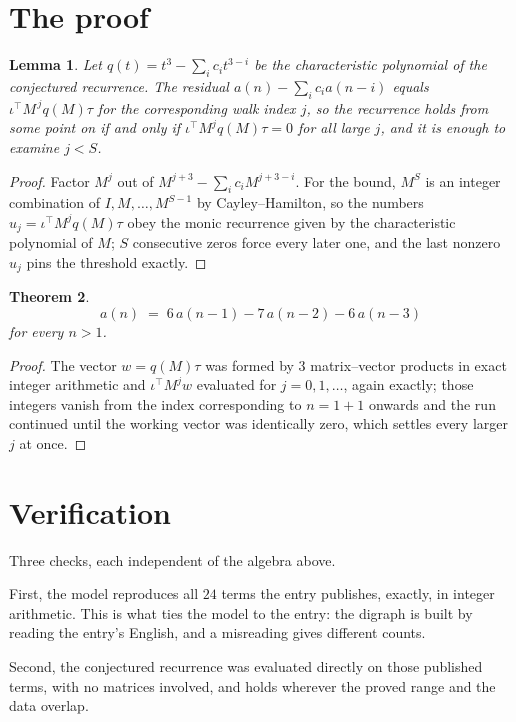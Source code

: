 \documentclass[11pt,a4paper]{article}
\theoremstyle{plain}
\newtheorem{theorem}{Theorem}
\newtheorem{lemma}[theorem]{Lemma}
\theoremstyle{definition}
\begin{document}
\section{The proof}

\begin{lemma}\label{lem:crit}
Let $q(t)=t^{3}-\sum_i c_it^{3-i}$ be the characteristic polynomial of the
conjectured recurrence. The residual $a(n)-\sum_ic_ia(n-i)$ equals
$\iota^{\!\top}M^{\,j}q(M)\tau$ for the corresponding walk index $j$, so the recurrence
holds from some point on if and only if $\iota^{\!\top}M^{j}q(M)\tau=0$ for all large $j$,
and it is enough to examine $j<S$.
\end{lemma}

\begin{proof}
Factor $M^{j}$ out of $M^{j+3}-\sum_ic_iM^{j+3-i}$. For the bound, $M^{S}$
is an integer combination of $I,M,\dots,M^{S-1}$ by Cayley--Hamilton, so the numbers
$u_j=\iota^{\!\top}M^{j}q(M)\tau$ obey the monic recurrence given by the characteristic
polynomial of $M$; $S$ consecutive zeros force every later one, and the last nonzero $u_j$
pins the threshold exactly.
\end{proof}

\begin{theorem}
\[
a(n)\;=\;6\,a(n-1) - 7\,a(n-2) - 6\,a(n-3)
\]
for every $n>1$.
\end{theorem}

\begin{proof}
The vector $w=q(M)\tau$ was formed by $3$ matrix--vector products in exact integer
arithmetic and $\iota^{\!\top}M^{j}w$ evaluated for $j=0,1,\dots$, again exactly; those
integers vanish from the index corresponding to $n=1+1$ onwards and the run continued
until the working vector was identically zero, which settles every larger $j$ at once.
\end{proof}

\section{Verification}

Three checks, each independent of the algebra above.

First, the model reproduces all $24$ terms the entry publishes, exactly, in integer
arithmetic. This is what ties the model to the entry: the digraph is built by reading the
entry's English, and a misreading gives different counts.

Second, the conjectured recurrence was evaluated directly on those published terms, with no
matrices involved, and holds wherever the proved range and the data overlap.
\end{document}
